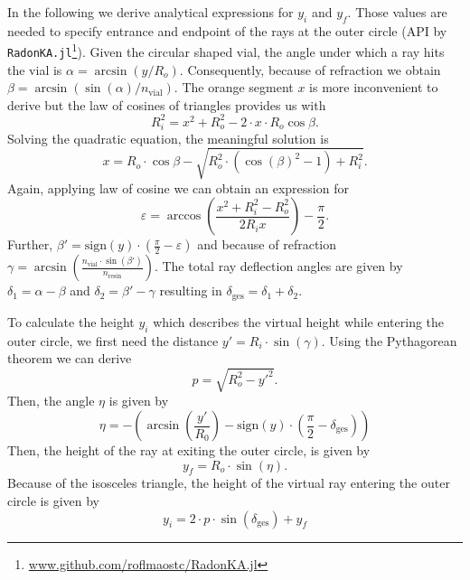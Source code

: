 \documentclass{article}
\begin{document}
\noindent In the following we derive analytical expressions for $y_i$ and $y_f$. 
Those values are needed to specify entrance and endpoint of the rays at the outer circle (API by \texttt{RadonKA.jl}\footnote{\url{www.github.com/roflmaostc/RadonKA.jl}}).
Given the circular shaped vial, the angle under which a ray hits the vial is $\alpha = \arcsin(y / R_o)$. Consequently, because of refraction we obtain $\beta=\arcsin(\sin(\alpha) / n_\text{vial})$.
The orange segment $x$ is more inconvenient to derive but the law of cosines of triangles provides us with 
\begin{equation}
    R_i^2 = x^2 + R_o^2 - 2 \cdot x \cdot R_o \cos{\beta}.
\end{equation}
Solving the quadratic equation, the meaningful solution is
\begin{equation}
    x = R_o \cdot \cos{\beta} -  \sqrt{R_o^2 \cdot (\cos(\beta)^2 - 1) + R_i^2}.
\end{equation}
Again, applying law of cosine we can obtain an expression for
\begin{equation}
    \varepsilon = \arccos\left(\frac{x^2 + R_i^2 - R_o^2}{2 R_i x}\right) - \frac{\pi}{2}.
\end{equation}
Further, $\beta'=\mathrm{sign}(y) \cdot (\frac{\pi}{2}- \varepsilon)$ and because of refraction $\gamma=\arcsin(\frac{n_\text{vial} \cdot \sin(\beta')}{n_\text{resin}})$. 
The total ray deflection angles are given by $\delta_1=\alpha - \beta$ and $\delta_2=\beta'-\gamma$ resulting in $\delta_\text{ges} = \delta_1 + \delta_2$. 

\noindent
To calculate the height $y_i$ which describes the virtual height while entering the outer circle, we first need the distance $y' = R_i \cdot \sin(\gamma)$.
Using the Pythagorean theorem we can derive
\begin{equation}
    p = \sqrt{R_o^2-y'^2}.
\end{equation}
Then, the angle $\eta$ is given by
\begin{equation}
    \eta =- \left(\arcsin\left(\frac{y'}{R_0}\right) - \text{sign}(y) \cdot \left(\frac{\pi}{2}-\delta_{\text{ges}}\right)\right)
\end{equation}
Then, the height of the ray at exiting the outer circle, is given by 
\begin{equation}
    y_f = R_o \cdot \sin(\eta). 
\end{equation}
Because of the isosceles triangle, the height of the virtual ray entering the outer circle is given by
\begin{equation}
    y_i =  2\cdot p \cdot \sin(\delta_\text{ges}) + y_f 
\end{equation}
\end{document}
